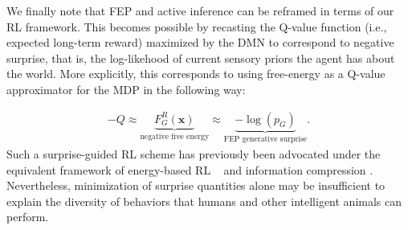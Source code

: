 \documentclass[10pt,letterpaper]{article}
\def\z{\mathbf{z}}
\def\x{\mathbf{x}}
\begin{document}
We finally note that FEP and active inference can be reframed in terms of
our RL framework.
This becomes possible by recasting the Q-value function (i.e., expected long-term reward) maximized by the DMN to
correspond to negative surprise,
that is, the log-likehood of current sensory priors
the agent has about the world. More explicitly, this corresponds to using free-energy as a Q-value approximator for the MDP in the following way:

\begin{eqnarray*}
  -Q \approx \underbrace{F^R_G(\x)}_{\text{negative free energy}} \approx \underbrace{-\log (p_G)}_{\text{FEP generative surprise}}.
    \end{eqnarray*}
Such a surprise-guided RL scheme has previously been advocated
under the equivalent framework of energy-based RL
~\citep{sallans2004,elfwing2016free} and information compression \citep{schmidhuber2010,mohamed2015}.
Nevertheless, minimization of surprise quantities alone
may be insufficient to explain the diversity of behaviors that humans and other intelligent animals can perform.
\end{document}
